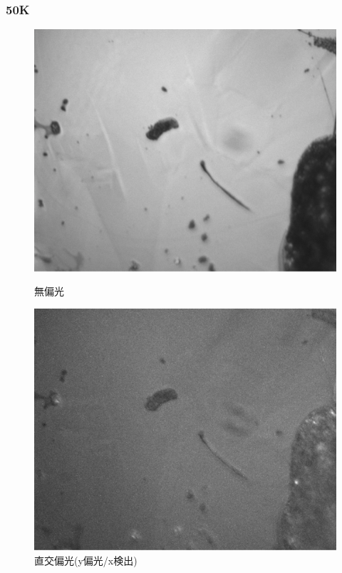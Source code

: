 \documentclass[11pt,a4paper]{jsarticle}
\begin{document}
\subsubsection{50K}
\begin{figure}[htbp]
 \begin{minipage}{0.5\hsize}
  \begin{center}
   \includegraphics[width=\hsize]{nonpol50.eps}
  \end{center}
  \caption{無偏光}
  \label{fig:nonpol50}
 \end{minipage}
 \begin{minipage}{0.5\hsize}
  \begin{center}
   \includegraphics[width=\hsize]{vh50.eps}
  \end{center}
  \caption{直交偏光(y偏光/x検出)}
  \label{fig:vh50}
 \end{minipage}
\end{figure}
\end{document}
